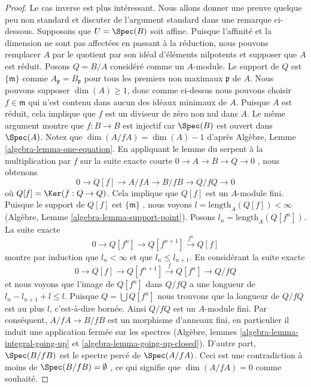 \begin{proof}
\medskip\noindent
Le cas inverse est plus intéressant. Nous allons donner une preuve quelque peu non
standard et discuter de l'argument standard dans une remarque ci-dessous.
Supposons que  $U = \Spec(B)$  soit affine. Puisque l'affinité et la dimension ne sont
pas affectées en passant à la réduction, nous pouvons remplacer  $A$  par
le quotient par son idéal d'éléments nilpotents et supposer que  $A$  est
réduit. Posons  $Q = B/A$  considéré comme un  $A$-module. Le support de
 $Q$  est  $\{\mathfrak m\}$  comme  $A_\mathfrak p = B_\mathfrak p$  pour tous les premiers non
maximaux  $\mathfrak p$  de  $A$. Nous pouvons supposer  $\dim(A) \geq 1$, donc
comme ci-dessus nous pouvons choisir  $f \in \mathfrak m$  qui n'est contenu dans aucun des
idéaux minimaux de  $A$. Puisque  $A$  est réduit, cela implique
que  $f$  est un diviseur de zéro non nul dans  $A$. Le même
argument montre que  $f : B \to B$  est injectif car  $\Spec(B)$  est ouvert dans
 $\Spec(A)$. Notez que  $\dim(A/fA) = \dim(A) - 1$  d'après Algèbre, Lemme  \ref{algebra-lemma-one-equation}. En
appliquant le lemme du serpent à la multiplication par  $f$  sur la suite
exacte courte  $0 \to A \to B \to Q \to 0$ , nous obtenons
$$
0 \to Q[f] \to A/fA \to B/fB \to Q/fQ \to 0
$$
où  $Q[f] = \Ker(f : Q \to Q)$. Cela implique que  $Q[f]$  est un  $A$-module fini.
Puisque le support de  $Q[f]$  est  $\{\mathfrak m\}$ , nous voyons  $l = \text{length}_A(Q[f]) < \infty$ 
(Algèbre, Lemme  \ref{algebra-lemma-support-point}). Posons  $l_n = \text{length}_A(Q[f^n])$. La suite exacte
$$
0 \to Q[f^n] \to Q[f^{n + 1}] \xrightarrow{f^n} Q[f]
$$
montre par induction que  $l_n < \infty$  et que  $l_n \leq l_{n + 1}$. En considérant la suite
exacte
$$
0 \to Q[f] \to Q[f^{n + 1}] \xrightarrow{f} Q[f^n] \to Q/fQ
$$
et nous voyons que l'image de  $Q[f^n]$  dans  $Q/fQ$  a une longueur de
 $l_n - l_{n + 1} + l \leq l$. Puisque  $Q = \bigcup Q[f^n]$  nous trouvons que la longueur de  $Q/fQ$ 
est au plus  $l$, c'est-à-dire bornée. Ainsi  $Q/fQ$  est un
 $A$-module fini. Par conséquent,  $A/fA \to B/fB$  est un morphisme d'anneaux
fini, en particulier il induit une application fermée sur les spectres (Algèbre,
lemmes  \ref{algebra-lemma-integral-going-up}  et  \ref{algebra-lemma-going-up-closed}). D'autre part,  $\Spec(B/fB)$  est le spectre
percé de  $\Spec(A/fA)$. Ceci est une contradiction à moins de  $\Spec(B/fB) = \emptyset$ , ce qui
signifie que  $\dim(A/fA) = 0$  comme souhaité.
\end{proof}

